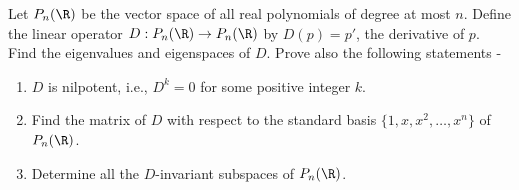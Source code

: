 \documentclass[openany]{book}
\begin{document}
\begin{exercise}
    Let $P_n(\R)$ be the vector space of all real polynomials of degree at most $n$. Define the linear operator $D: P_n(\R) \to P_n(\R)$ by $D(p) = p'$, the derivative of $p$. Find the eigenvalues and eigenspaces of $D$. Prove also the following statements - 
    \begin{enumerate}
        \item $D$ is nilpotent, i.e., $D^k = 0$ for some positive integer $k$.
        \item Find the matrix of $D$ with respect to the standard basis $\{1, x, x^2, \ldots , x^n\}$ of $P_n(\R)$.
        \item Determine all the $D$-invariant subspaces of $P_n(\R)$.
    \end{enumerate}
\end{exercise}
\end{document}

